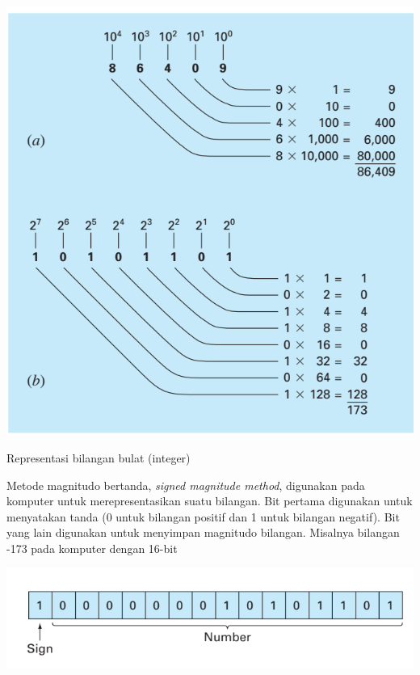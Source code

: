 \begin{frame}

{\centering
\includegraphics[height=0.8\textheight]{../chapra_7th/Chapra_Fig_3_5.png}
\par}

\end{frame}


\begin{frame}{Representasi bilangan bulat (integer)}

Metode magnitudo bertanda, \textit{signed magnitude method}, digunakan pada komputer
untuk merepresentasikan suatu bilangan. Bit pertama digunakan untuk menyatakan tanda
(0 untuk bilangan positif dan 1 untuk bilangan negatif).
Bit yang lain digunakan untuk menyimpan magnitudo bilangan.
Misalnya bilangan -173 pada komputer dengan 16-bit

{\centering
\includegraphics[height=0.3\textheight]{../chapra_7th/Chapra_Fig_3_6.png}
\par}

\end{frame}


